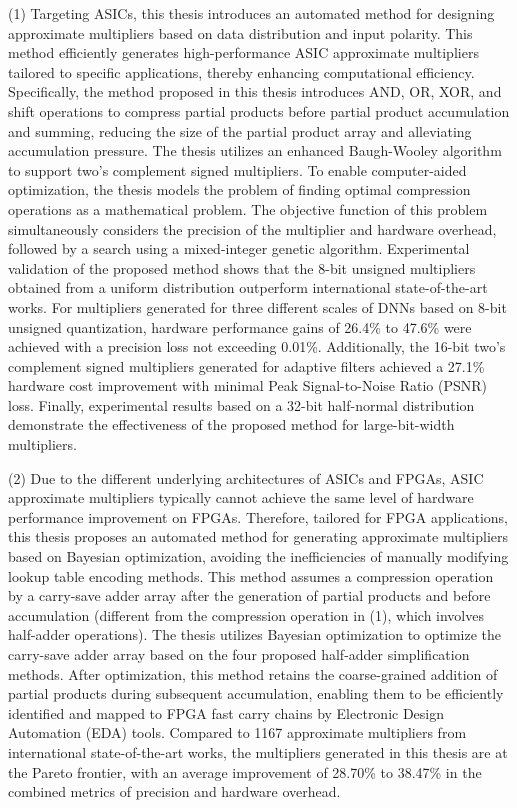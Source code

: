 \begin{abstract*}
    (1) Targeting ASICs, this thesis introduces an automated method for designing approximate multipliers based on data distribution and input polarity. This method efficiently generates high-performance ASIC approximate multipliers tailored to specific applications, thereby enhancing computational efficiency. Specifically, the method proposed in this thesis introduces AND, OR, XOR, and shift operations to compress partial products before partial product accumulation and summing, reducing the size of the partial product array and alleviating accumulation pressure. The thesis utilizes an enhanced Baugh-Wooley algorithm to support two's complement signed multipliers. To enable computer-aided optimization, the thesis models the problem of finding optimal compression operations as a mathematical problem. The objective function of this problem simultaneously considers the precision of the multiplier and hardware overhead, followed by a search using a mixed-integer genetic algorithm. Experimental validation of the proposed method shows that the 8-bit unsigned multipliers obtained from a uniform distribution outperform international state-of-the-art works. For multipliers generated for three different scales of DNNs based on 8-bit unsigned quantization, hardware performance gains of 26.4\% to 47.6\% were achieved with a precision loss not exceeding 0.01\%. Additionally, the 16-bit two's complement signed multipliers generated for adaptive filters achieved a 27.1\% hardware cost improvement with minimal Peak Signal-to-Noise Ratio (PSNR) loss. Finally, experimental results based on a 32-bit half-normal distribution demonstrate the effectiveness of the proposed method for large-bit-width multipliers.
    
    (2) Due to the different underlying architectures of ASICs and FPGAs, ASIC approximate multipliers typically cannot achieve the same level of hardware performance improvement on FPGAs. Therefore, tailored for FPGA applications, this thesis proposes an automated method for generating approximate multipliers based on Bayesian optimization, avoiding the inefficiencies of manually modifying lookup table encoding methods. This method assumes a compression operation by a carry-save adder array after the generation of partial products and before accumulation (different from the compression operation in (1), which involves half-adder operations). The thesis utilizes Bayesian optimization to optimize the carry-save adder array based on the four proposed half-adder simplification methods. After optimization, this method retains the coarse-grained addition of partial products during subsequent accumulation, enabling them to be efficiently identified and mapped to FPGA fast carry chains by Electronic Design Automation (EDA) tools. Compared to 1167 approximate multipliers from international state-of-the-art works, the multipliers generated in this thesis are at the Pareto frontier, with an average improvement of 28.70\% to 38.47\% in the combined metrics of precision and hardware overhead.


\end{abstract*}
